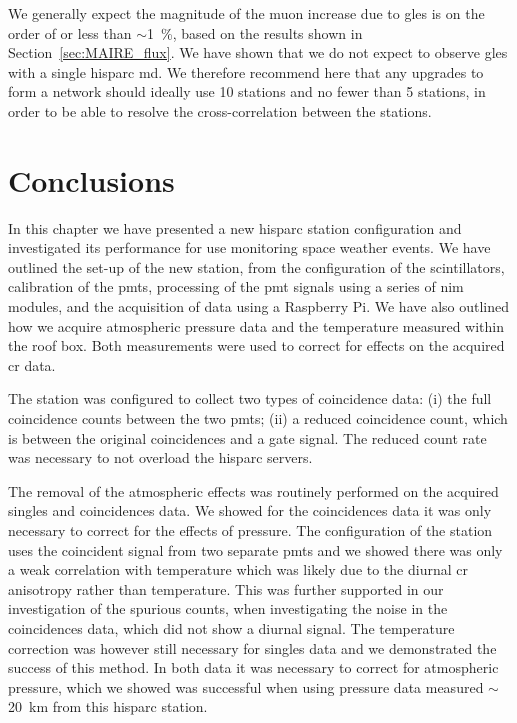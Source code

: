 We generally expect the magnitude of the muon increase due to \glspl{gle} is on the order of or less than $\sim$1~\%, based on the results shown in Section~\ref{sec:MAIRE_flux}. We have shown that we do not expect to observe \glspl{gle} with a single \gls{hisparc} \gls{md}.  We therefore recommend here that any upgrades to form a network should ideally use 10 stations and no fewer than 5 stations, in order to be able to resolve the cross-correlation between the stations. %


\section{Conclusions}\label{sec:HS_14008_conclusion}

In this chapter we have presented a new \gls{hisparc} station configuration and investigated its performance for use monitoring space weather events. We have outlined the set-up of the new station, from the configuration of the scintillators, calibration of the \glspl{pmt}, processing of the \gls{pmt} signals using a series of \gls{nim} modules, and the acquisition of data using a Raspberry Pi. We have also outlined how we acquire atmospheric pressure data and the temperature measured within the roof box. Both measurements were used to correct for effects on the acquired \gls{cr} data.

The station was configured to collect two types of coincidence data: (i) the full coincidence counts between the two \glspl{pmt}; (ii) a reduced coincidence count, which is between the original coincidences and a gate signal. The reduced count rate was necessary to not overload the \gls{hisparc} servers.

The removal of the atmospheric effects was routinely performed on the acquired singles and coincidences data. We showed for the coincidences data it was only necessary to correct for the effects of pressure. The configuration of the station uses the coincident signal from two separate \glspl{pmt} and we showed there was only a weak correlation with temperature which was likely due to the diurnal \gls{cr} anisotropy rather than temperature. This was further supported in our investigation of the spurious counts, when investigating the noise in the coincidences data, which did not show a diurnal signal. The temperature correction was however still necessary for singles data and we demonstrated the success of this method. In both data it was necessary to correct for atmospheric pressure, which we showed was successful when using pressure data measured  $\sim$20~km from this \gls{hisparc} station.

